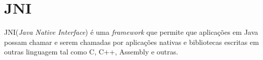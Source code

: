 \chapter{JNI}
\label{apend:jni}

JNI(\textit{Java Native Interface}) é uma \textit{framework} que permite que
aplicações em Java possam chamar e serem chamadas por aplicações nativas e
bibliotecas escritas em outras linguagem tal como C, C++, Assembly e outras.
